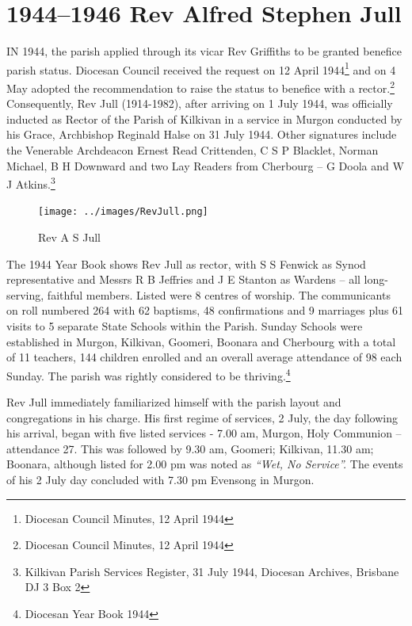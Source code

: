 \balance


\printendnotes[custom]
\setcounter{endnote}{0}
\chapter{1944--1946 Rev Alfred Stephen Jull}
\nobalance


\lettrine[lines=3]{I}{N}
 1944, the parish applied through its vicar Rev Griffiths to be granted benefice parish status. Diocesan Council received the request on 12 April 1944\footnote{Diocesan Council Minutes, 12 April 1944} and on 4 May adopted the recommendation to raise the status to benefice with a rector.\footnote{Diocesan Council Minutes, 12 April 1944} Consequently, Rev Jull (1914-1982), after arriving on 1 July 1944, was officially inducted as Rector of the Parish of Kilkivan in a service in Murgon conducted by his Grace, Archbishop Reginald Halse on 31 July 1944. Other signatures include the Venerable Archdeacon Ernest Read Crittenden, C S P Blacklet, Norman Michael, B H Downward and two Lay Readers from Cherbourg -- G Doola and W J Atkins.\footnote{Kilkivan Parish Services Register, 31 July 1944, Diocesan Archives, Brisbane DJ 3 Box 2}







\begin{figure}
\begin{center}
\texttt{[image: ../images/RevJull.png]}
\caption{Rev A S Jull}
\end{center}
\end{figure}




The 1944 Year Book shows Rev Jull as rector, with S S Fenwick as Synod representative and Messrs R B Jeffries and J E Stanton as Wardens -- all long-serving, faithful members. Listed were 8 centres of worship. The communicants on roll numbered 264 with 62 baptisms, 48 confirmations and 9 marriages plus 61 visits to 5 separate State Schools within the Parish. Sunday Schools were established in Murgon, Kilkivan, Goomeri, Boonara and Cherbourg with a total of 11 teachers, 144 children enrolled and an overall average attendance of 98 each Sunday. The parish was rightly considered to be thriving.\footnote{Diocesan Year Book 1944}


Rev Jull immediately familiarized himself with the parish layout and congregations in his charge. His first regime of services, 2 July, the day following his arrival, began with five listed services - 7.00 am, Murgon, Holy Communion -- attendance 27. This was followed by 9.30 am, Goomeri; Kilkivan, 11.30 am; Boonara, although listed for 2.00 pm was noted as \emph{``Wet, No Service''.} The events of his 2 July day concluded with 7.30 pm Evensong in Murgon.



